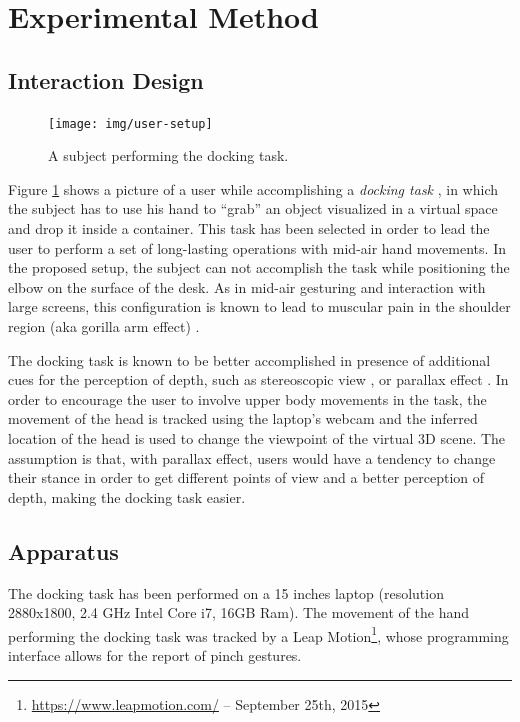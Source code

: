\section{Experimental Method}

\subsection{Interaction Design}

\begin{figure}
\centering%
\texttt{[image: img/user-setup]}
\caption{A subject performing the docking task.}%
\label{fig:user-setup}
\end{figure}

Figure \ref{fig:user-setup} shows a picture of a user while accomplishing a \emph{docking task} \cite{zhai_quantifying_1998}, in which the subject has to use his hand to ``grab'' an object visualized in a virtual space and drop it inside a container. This task has been selected in order to lead the user to perform a set of long-lasting operations with mid-air hand movements. In the proposed setup, the subject can not accomplish the task while positioning the elbow on the surface of the desk. As in mid-air gesturing and interaction with large screens, this configuration is known to lead to muscular pain in the shoulder region (aka gorilla arm effect) \cite{hincapie-ramos_consumed_2014}.

The docking task is known to be better accomplished in presence of additional cues for the perception of depth, such as stereoscopic view \cite{boritz_study_1998}, or parallax effect \cite{Ware:1993:FTV:169059.169066}.
In order to encourage the user to involve upper body movements in the task, the movement of the head is tracked using the laptop's webcam and the inferred location of the head is used to change the viewpoint of the virtual 3D scene. The assumption is that, with parallax effect, users would have a tendency to change their stance in order to get different points of view and a better perception of depth, making the docking task easier.


\subsection{Apparatus}
The docking task has been performed on a 15 inches laptop (resolution 2880x1800, 2.4 GHz Intel Core i7, 16GB Ram).
The movement of the hand performing the docking task was tracked by a Leap Motion\footnote{\url{https://www.leapmotion.com/} -- September 25th, 2015}, whose programming interface allows for the report of pinch gestures.


